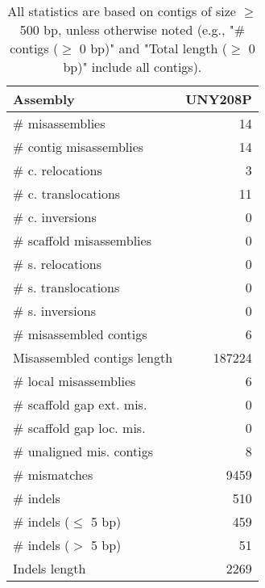 \documentclass[12pt,a4paper]{article}
\begin{document}
\begin{table}[ht]
\begin{center}
\caption{All statistics are based on contigs of size $\geq$ 500 bp, unless otherwise noted (e.g., "\# contigs ($\geq$ 0 bp)" and "Total length ($\geq$ 0 bp)" include all contigs).}
\begin{tabular}{|l*{1}{|r}|}
\hline
Assembly & UNY208P \\ \hline
\# misassemblies & 14 \\ \hline
\hspace{2mm}\# contig misassemblies & 14 \\ \hline
\hspace{5mm}\# c. relocations & 3 \\ \hline
\hspace{5mm}\# c. translocations & 11 \\ \hline
\hspace{5mm}\# c. inversions & 0 \\ \hline
\hspace{2mm}\# scaffold misassemblies & 0 \\ \hline
\hspace{5mm}\# s. relocations & 0 \\ \hline
\hspace{5mm}\# s. translocations & 0 \\ \hline
\hspace{5mm}\# s. inversions & 0 \\ \hline
\# misassembled contigs & 6 \\ \hline
Misassembled contigs length & 187224 \\ \hline
\# local misassemblies & 6 \\ \hline
\# scaffold gap ext. mis. & 0 \\ \hline
\# scaffold gap loc. mis. & 0 \\ \hline
\# unaligned mis. contigs & 8 \\ \hline
\# mismatches & 9459 \\ \hline
\# indels & 510 \\ \hline
\hspace{5mm}\# indels ($\leq$ 5 bp) & 459 \\ \hline
\hspace{5mm}\# indels ($>$ 5 bp) & 51 \\ \hline
Indels length & 2269 \\ \hline
\end{tabular}
\end{center}
\end{table}
\end{document}
